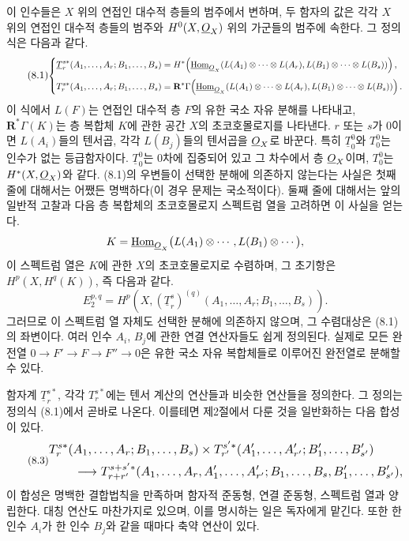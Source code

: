 이 인수들은 $X$ 위의 연접인 대수적 층들의 범주에서 변하며, 두 함자의
값은 각각 $X$ 위의 연접인 대수적 층들의 범주와
$H^{0}(X,\underline{O}_X)$ 위의 가군들의 범주에 속한다. 그 정의식은 다음과 같다.
\begin{equation}\tag{8.1}
\resizebox{\textwidth}{!}{$
\left\{
\begin{aligned}
\underline{T}_{r}^{s*}(A_1,\ldots,A_r;B_1,\ldots,B_s)
  &={}H^{*}\!\left(
    \Homsh_{\Osh_X}\!\left(
      L(A_1)\otimes\cdots\otimes L(A_r),
      L(B_1)\otimes\cdots\otimes L(B_s)
    \right)\right),\\[3pt]
T_{r}^{s*}(A_1,\ldots,A_r;B_1,\ldots,B_s)
  &={}\mathbf R^{*}\Gamma\!\left(
    \Homsh_{\Osh_X}\!\left(
      L(A_1)\otimes\cdots\otimes L(A_r),
      L(B_1)\otimes\cdots\otimes L(B_s)
    \right)\right).
\end{aligned}
\right.
$}
\end{equation}
이 식에서 $L(F)$는 연접인 대수적 층 $F$의 유한 국소 자유 분해를
나타내고, $\mathbf R^{*}\Gamma(K)$는 층 복합체 $K$에 관한 공간 $X$의
초코호몰로지를 나타낸다. $r$ 또는 $s$가 0이면 $L(A_i)$들의 텐서곱,
각각 $L(B_j)$들의 텐서곱을 $\underline{O}_X$로 바꾼다. 특히
$\underline{T}_{0}^{0}$와 $T_{0}^{0}$는 인수가 없는 등급함자이다.
$\underline{T}_{0}^{0}$는 0차에 집중되어 있고 그 차수에서 층
$\underline{O}_X$이며, $T_{0}^{0}$는 $H^{*}(X,\underline{O}_X)$와 같다. (8.1)의 우변들이
선택한 분해에 의존하지 않는다는 사실은 첫째 줄에 대해서는 어쨌든
명백하다(이 경우 문제는 국소적이다). 둘째 줄에 대해서는 앞의 일반적
고찰과 다음 층 복합체의 초코호몰로지 스펙트럼 열을 고려하면 이 사실을
얻는다.
\[
  K=\underline{\operatorname{Hom}}_{\underline{O}_X}\bigl(L(A_1)\otimes\cdots,
      L(B_1)\otimes\cdots\bigr),
\]
이 스펙트럼 열은 $K$에 관한 $X$의 초코호몰로지로 수렴하며, 그 초기항은
$H^{p}(X,H^{q}(K))$, 즉 다음과 같다.
\begin{equation}\tag{8.2}
  E_{2}^{p,q}
  =H^{p}\!\left(X,
    (\underline{T}_{r}^{s})^{(q)}
      (A_1,\ldots,A_r;B_1,\ldots,B_s)\right).
\end{equation}
그러므로 이 스펙트럼 열 자체도 선택한 분해에 의존하지 않으며, 그
수렴대상은 (8.1)의 좌변이다. 여러 인수 $A_i$, $B_j$에 관한 연결
연산자들도 쉽게 정의된다. 실제로 모든 완전열
$0\longrightarrow F'\longrightarrow F\longrightarrow F''\longrightarrow0$은
유한 국소 자유 복합체들로 이루어진 완전열로 분해할 수 있다.

함자계 $\underline{T}_{r}^{s*}$, 각각 $T_{r}^{s*}$에는 텐서 계산의
연산들과 비슷한 연산들을 정의한다. 그 정의는 정의식 (8.1)에서 곧바로
나온다. 이를테면 제2절에서 다룬 것을 일반화하는 다음 합성이 있다.
\begin{equation}\tag{8.3}
\resizebox{\textwidth}{!}{$
\begin{aligned}
&T_{r}^{s*}(A_1,\ldots,A_r;B_1,\ldots,B_s)
\times T_{r'}^{s'*}(A'_1,\ldots,A'_{r'};B'_1,\ldots,B'_{s'})\\
&\qquad\longrightarrow
T_{r+r'}^{s+s'*}
(A_1,\ldots,A_r,A'_1,\ldots,A'_{r'};
 B_1,\ldots,B_s,B'_1,\ldots,B'_{s'}),
\end{aligned}
$}
\end{equation}
이 합성은 명백한 결합법칙을 만족하며 함자적 준동형, 연결 준동형,
스펙트럼 열과 양립한다. 대칭 연산도 마찬가지로 있으며, 이를 명시하는
일은 독자에게 맡긴다. 또한 한 인수 $A_i$가 한 인수 $B_j$와 같을 때마다
축약 연산이 있다.

